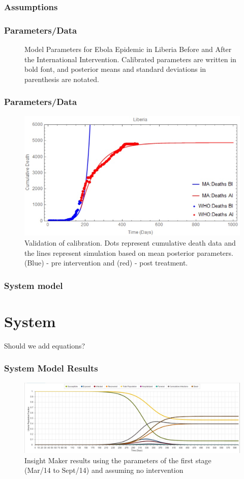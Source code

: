 \documentclass[30pt]{beamer}
\begin{document}
\begin{frame}
\frametitle{Assumptions}
\end{frame}

\begin{frame}
\frametitle{Parameters/Data}
\begin{figure}[!h]
  \centering
  \caption{Model Parameters for Ebola Epidemic in Liberia Before and After the International Intervention. Calibrated parameters are written in bold font, and posterior means and standard deviations in parenthesis are notated. } 
\label{fig:compartment} 
\end{figure}
\end{frame}

\begin{frame}
\frametitle{Parameters/Data}
\begin{figure}[!h]
  \centering
  \includegraphics[width=1\textwidth]{CumulativeDeathMathematica}
  \caption{Validation of calibration. Dots represent cumulative death data and the lines represent simulation
based on mean posterior parameters. (Blue) - pre intervention and (red) - post treatment.} 
\end{figure}
\end{frame}


\begin{frame}
\frametitle{System model}
\section{System}
Should we add equations?
\end{frame}

\begin{frame}
\frametitle{System Model Results}
\begin{figure}[!h]
  \centering
  \includegraphics[width=1\textwidth]{LB_NoInt_SD_IM}
  \caption{ Insight Maker results using the parameters of the first stage (Mar/14 to Sept/14) and assuming no intervention}
\label{fig:LB_IM_NoIn} 
\end{figure}
\end{frame}
\end{document}
